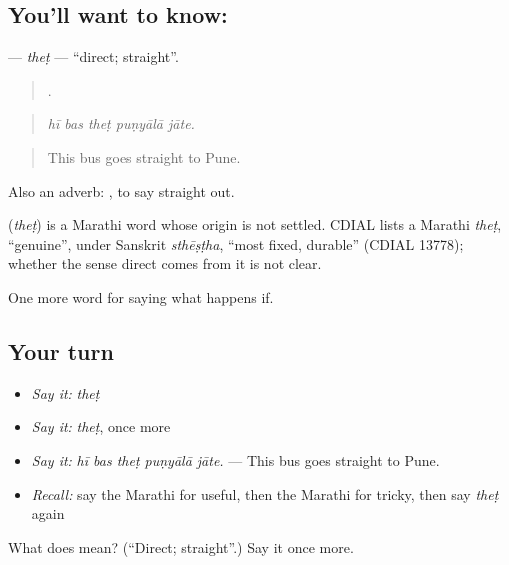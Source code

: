 \subsection*{You'll want to know: }
\textbf{} — \emph{theṭ} — \textquotedblleft{}direct; straight\textquotedblright{}.

\begin{quote}
    .
\end{quote}

\begin{quote}
\emph{hī bas theṭ puṇyālā jāte.}
\end{quote}

\begin{quote}
This bus goes straight to Pune.
\end{quote}

Also an adverb:  , to say straight out.

\begin{cousinweb}
\textbf{} (\emph{theṭ}) is a Marathi word whose origin is not settled. CDIAL lists a Marathi \emph{theṭ}, \textquotedblleft{}genuine\textquotedblright{}, under Sanskrit \emph{sthēṣṭha}, \textquotedblleft{}most fixed, durable\textquotedblright{} (CDIAL 13778); whether the sense direct comes from it is not clear.
\end{cousinweb}

\begin{grammarlens}[title={What you've built}]
One more word for saying what happens if.
\end{grammarlens}

\subsection*{Your turn}
\begin{itemize}
\raggedright
  \item \emph{Say it:} \emph{theṭ}
  \item \emph{Say it:} \emph{theṭ}, once more
  \item \emph{Say it:} \emph{hī bas theṭ puṇyālā jāte.} — This bus goes straight to Pune.
  \item \emph{Recall:} say the Marathi for useful, then the Marathi for tricky, then say \emph{theṭ} again
\end{itemize}

\begin{tcolorbox}[breakable,colback=teal!4,colframe=teal!35!black,title={Before you move on}]
What does  mean? (\textquotedblleft{}Direct; straight\textquotedblright{}.) Say it once more.
\end{tcolorbox}
